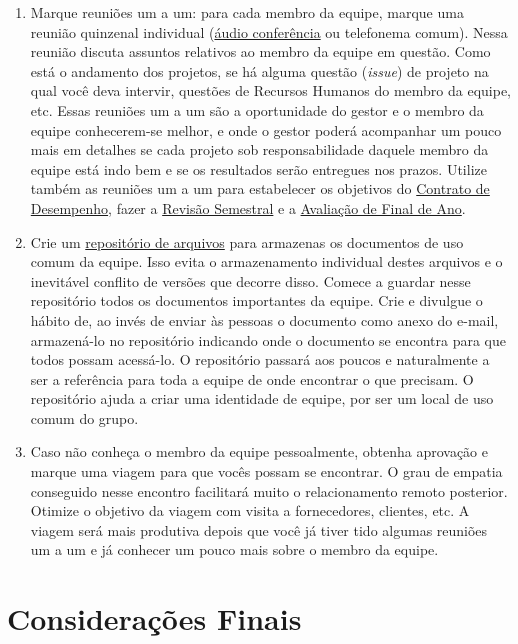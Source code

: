 \documentclass[12pt]{article} %
\begin{document}
\begin{enumerate}
\item Marque reuniões um a um: para cada membro da equipe, marque uma reunião quinzenal individual
		(\underline{áudio conferência} ou telefonema comum).
		Nessa reunião discuta assuntos relativos ao membro da equipe em questão. Como está o
		andamento dos projetos, se há alguma questão (\textit{issue}) de projeto na qual você deva intervir, questões
		de Recursos Humanos do membro da equipe, etc. Essas
		reuniões um a um são a oportunidade do gestor e o membro da equipe conhecerem-se melhor,
		e onde o gestor poderá acompanhar um pouco mais em detalhes se cada
		projeto sob responsabilidade daquele membro da equipe está indo bem e se os 
		resultados serão entregues nos prazos. 
		Utilize também as reuniões um a um para estabelecer os objetivos do \underline{Contrato de Desempenho}, 
		fazer a \underline{Revisão Semestral} e a \underline{Avaliação de Final de Ano}.


\item Crie um \underline{repositório de arquivos} para armazenas os documentos de uso comum da equipe. Isso evita o armazenamento 
	individual destes arquivos e o inevitável conflito de versões que decorre disso. 
	Comece a guardar nesse repositório todos os documentos importantes
	da equipe. Crie e divulgue o hábito de, ao invés de enviar às pessoas o documento como anexo do e-mail, armazená-lo
	no repositório indicando onde o documento se encontra para que todos possam acessá-lo. O repositório
	passará aos poucos e naturalmente a ser a referência para toda a equipe de onde encontrar
	o que precisam. O repositório ajuda a criar uma identidade de equipe, por ser um local de uso comum do grupo.


\item Caso não conheça o membro da equipe pessoalmente, obtenha aprovação e
	marque uma viagem para que vocês possam se encontrar. O grau de empatia conseguido nesse encontro facilitará muito o relacionamento
	remoto posterior. Otimize o objetivo da viagem
	com visita a fornecedores, clientes, etc. A viagem será mais produtiva depois que você já
	tiver tido algumas reuniões um a um e já conhecer um pouco mais sobre o membro da equipe.

\end{enumerate}


\section{\fontsize{12}{12}\textbf{Considerações Finais}}
\end{document}
